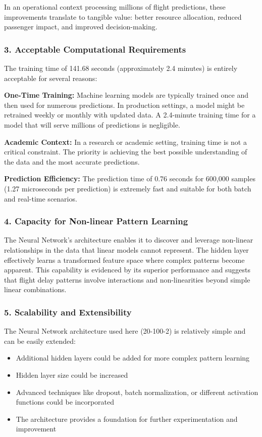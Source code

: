 \documentclass[sigconf]{acmart}
\begin{document}
In an operational context processing millions of flight predictions, these improvements translate to tangible value: better resource allocation, reduced passenger impact, and improved decision-making.

\subsubsection{3. Acceptable Computational Requirements}

The training time of 141.68 seconds (approximately 2.4 minutes) is entirely acceptable for several reasons:

\textbf{One-Time Training:} Machine learning models are typically trained once and then used for numerous predictions. In production settings, a model might be retrained weekly or monthly with updated data. A 2.4-minute training time for a model that will serve millions of predictions is negligible.

\textbf{Academic Context:} In a research or academic setting, training time is not a critical constraint. The priority is achieving the best possible understanding of the data and the most accurate predictions.

\textbf{Prediction Efficiency:} The prediction time of 0.76 seconds for 600,000 samples (1.27 microseconds per prediction) is extremely fast and suitable for both batch and real-time scenarios.

\subsubsection{4. Capacity for Non-linear Pattern Learning}

The Neural Network's architecture enables it to discover and leverage non-linear relationships in the data that linear models cannot represent. The hidden layer effectively learns a transformed feature space where complex patterns become apparent. This capability is evidenced by its superior performance and suggests that flight delay patterns involve interactions and non-linearities beyond simple linear combinations.

\subsubsection{5. Scalability and Extensibility}

The Neural Network architecture used here (20-100-2) is relatively simple and can be easily extended:
\begin{itemize}
    \item Additional hidden layers could be added for more complex pattern learning
    \item Hidden layer size could be increased
    \item Advanced techniques like dropout, batch normalization, or different activation functions could be incorporated
    \item The architecture provides a foundation for further experimentation and improvement
\end{itemize}
\end{document}
